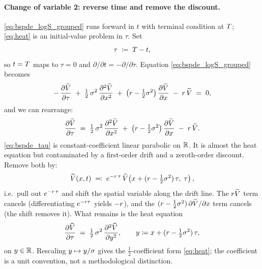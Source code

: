 \paragraph{Change of variable 2: reverse time and remove the discount.}
\eqref{eq:bspde_logS_grouped} runs forward in $t$ with terminal
condition at $T$; \eqref{eq:heat} is an initial-value problem
in $\tau$. Set
\begin{equation*}
  \tau \;\coloneqq\; T - t,
\end{equation*}
so $t = T$ maps to $\tau = 0$ and
$\partial/\partial t = -\partial/\partial \tau$. Equation
\eqref{eq:bspde_logS_grouped} becomes
\begin{equation}
  -\,\frac{\partial \widetilde V}{\partial \tau}
  \;+\; \tfrac{1}{2}\,\sigma^2\,\frac{\partial^2 \widetilde V}{\partial x^2}
  \;+\; \bigl(r - \tfrac{1}{2}\sigma^2\bigr)\,
        \frac{\partial \widetilde V}{\partial x}
  \;-\; r\,\widetilde V
  \;=\; 0,
  \label{eq:bspde_taufirst}
\end{equation}
and we can rearrange:
\begin{equation}
  \frac{\partial \widetilde V}{\partial \tau}
  \;=\; \tfrac{1}{2}\,\sigma^2\,\frac{\partial^2 \widetilde V}{\partial x^2}
  \;+\; \bigl(r - \tfrac{1}{2}\sigma^2\bigr)\,
        \frac{\partial \widetilde V}{\partial x}
  \;-\; r\,\widetilde V.
  \label{eq:bspde_tau}
\end{equation}
\eqref{eq:bspde_tau} is constant-coefficient linear parabolic on
$\mathbb{R}$. It is almost the heat equation but contaminated by a
first-order drift and a zeroth-order discount. Remove both by:
\begin{equation*}
  \widetilde V(x, t) \;\eqqcolon\; e^{-r\,\tau}\,
                                \widehat V\!\left(x + (r - \tfrac{1}{2}\sigma^2)\,\tau,\;\tau\right),
\end{equation*}
i.e.\ pull out $e^{-r\,\tau}$ and shift the spatial variable
along the drift line. The $r\widetilde V$ term cancels
(differentiating $e^{-r\tau}$ yields $-r$), and the
$(r - \tfrac{1}{2}\sigma^2)\,\partial\widetilde V/\partial x$
term cancels (the shift removes it). What remains is the heat
equation
\begin{equation}
  \frac{\partial \widehat V}{\partial \tau}
  \;=\; \tfrac{1}{2}\,\sigma^2\,\frac{\partial^2 \widehat V}{\partial y^2},
  \qquad y \coloneqq x + (r - \tfrac{1}{2}\sigma^2)\,\tau,
  \label{eq:heat_form}
\end{equation}
on $y \in \mathbb{R}$. Rescaling $y \mapsto y/\sigma$ gives the
$\tfrac{1}{2}$-coefficient form \eqref{eq:heat}; the coefficient
is a unit convention, not a methodological distinction.

